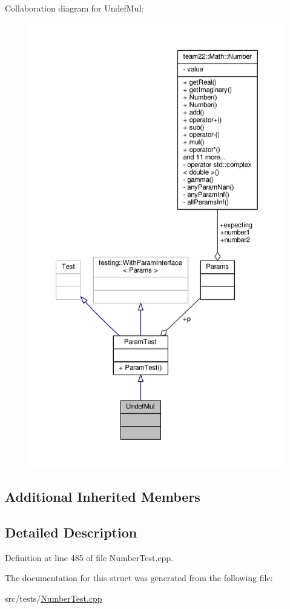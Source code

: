 Collaboration diagram for Undef\+Mul\+:
\nopagebreak
\begin{figure}[H]
\begin{center}
\leavevmode
\includegraphics[height=550pt]{struct_undef_mul__coll__graph}
\end{center}
\end{figure}
\subsection*{Additional Inherited Members}


\subsection{Detailed Description}


Definition at line 485 of file Number\+Test.\+cpp.



The documentation for this struct was generated from the following file\+:\begin{DoxyCompactItemize}
\item 
src/tests/\hyperlink{_number_test_8cpp}{Number\+Test.\+cpp}\end{DoxyCompactItemize}

